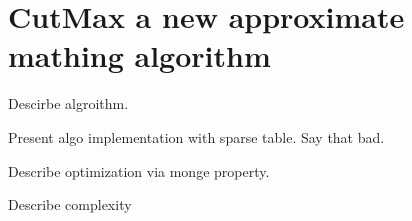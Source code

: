 \section{CutMax a new approximate mathing algorithm}
\label{section:our}

Descirbe algroithm.

Present algo implementation with sparse table. Say that bad.

Describe optimization via monge property.

Describe complexity